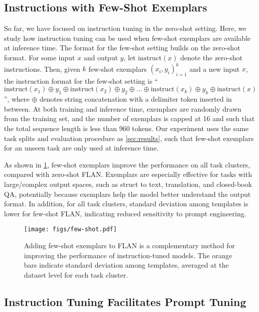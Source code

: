 \subsection{Instructions with Few-Shot Exemplars}\label{subsec:finetune}

\newcommand{\instruct}{\textrm{instruct}}
So far, we have focused on instruction tuning in the zero-shot setting. 
Here, we study how instruction tuning can be used when few-shot exemplars are available at inference time.
The format for the few-shot setting builds on the zero-shot format. 
For some input $x$ and output $y$, let $\instruct(x)$ denote the zero-shot instructions. 
Then, given $k$ few-shot exemplars ${(x_i, y_i)}_{i=1}^k$ and a new input $x$, the instruction format for the few-shot setting is ``$\instruct(x_1) \oplus y_1 \oplus \instruct(x_2) \oplus y_2 \oplus \ldots \oplus \instruct(x_k) \oplus y_k \oplus \instruct(x)$'', where $\oplus$ denotes string concatenation with a delimiter token inserted in between.
At both training and inference time, exemplars are randomly drawn from the training set, and the number of exemplars is capped at 16 and such that the total sequence length is less than 960 tokens. 
Our experiment uses the same task splits and evaluation procedure as \cref{sec:results}, such that few-shot exemplars for an unseen task are only used at inference time.

As shown in \cref{fig:few-shot}, few-shot exemplars improve the performance on all task clusters, compared with zero-shot FLAN. 
Exemplars are especially effective for tasks with large/complex output spaces, such as struct to text, translation, and closed-book QA, potentially because exemplars help the model better understand the output format. 
In addition, for all task clusters, standard deviation among templates is lower for few-shot FLAN, indicating reduced sensitivity to prompt engineering. 

\begin{figure}[h!]
    \centering
    \texttt{[image: figs/few-shot.pdf]}
    \vspace{-4mm}
    \caption{
    Adding few-shot exemplars to FLAN is a complementary method for improving the performance of instruction-tuned models.
    The orange bars indicate standard deviation among templates, averaged at the dataset level for each task cluster.
    }
    \label{fig:few-shot}
\end{figure}

\subsection{Instruction Tuning Facilitates Prompt Tuning}\label{subsec:prompt_tuning}

